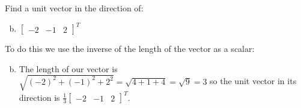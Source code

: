 \documentclass[../main.tex]{subfiles}
\begin{document}
Find a unit vector in the direction of:
\begin{enumerate}[a)]
	\setcounter{enumi}{1}
	\item $\begin{bmatrix}-2&-1&2\end{bmatrix}^T$
\end{enumerate}

\solution
To do this we use the inverse of the length of the vector as a scalar:
\begin{enumerate}[a)]
	\setcounter{enumi}{1}
	\item The length of our vector is $\sqrt{(-2)^2 + (-1)^2 + 2^2} = \sqrt{4 + 1 + 4} = \sqrt{9} = 3$ so the unit vector in its direction is $\frac{1}{3}\begin{bmatrix}-2&-1&2\end{bmatrix}^T$.
\end{enumerate}
\end{document}
